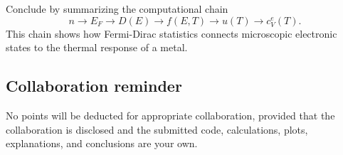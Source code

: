 Conclude by summarizing the computational chain
\[
n
\longrightarrow
E_F
\longrightarrow
D(E)
\longrightarrow
f(E,T)
\longrightarrow
u(T)
\longrightarrow
c_V^{e}(T).
\]
This chain shows how Fermi-Dirac statistics connects microscopic electronic states to the thermal response of a metal.

\subsection{Collaboration reminder}

No points will be deducted for appropriate collaboration, provided that the collaboration is disclosed and the submitted code, calculations, plots, explanations, and conclusions are your own.
